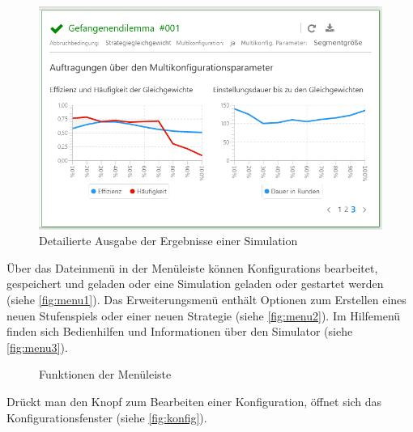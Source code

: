 \documentclass[parskip=full,11pt]{scrartcl}
\begin{document}
\begin{figure}[H]
	\centering
	\includegraphics[width=\textwidth]{images/home_out_multi_3.png}
	\caption{\label{fig:home_out_3}
		Detailierte Ausgabe der Ergebnisse einer Simulation}
\end{figure}

Über das Dateinmenü in der Menüleiste können \Glspl{Konfiguration} bearbeitet, gespeichert und geladen oder eine Simulation geladen oder gestartet werden (siehe \cref{fig:menu1}).
Das Erweiterungsmenü enthält Optionen zum Erstellen eines neuen \Gls{Stufenspiel}s oder einer neuen \Gls{Strategie} (siehe \cref{fig:menu2}). Im Hilfemenü finden sich Bedienhilfen und Informationen über den Simulator (siehe \cref{fig:menu3}).

\begin{figure}[ht]
	\centering
	\qquad
	\qquad
	\caption{\label{fig:menu}
		Funktionen der Menüleiste
	}
\end{figure}
\newpage
Drückt man den Knopf zum Bearbeiten einer \Gls{Konfiguration}, öffnet sich das Konfigurationsfenster (siehe \cref{fig:konfig}).
\end{document}
